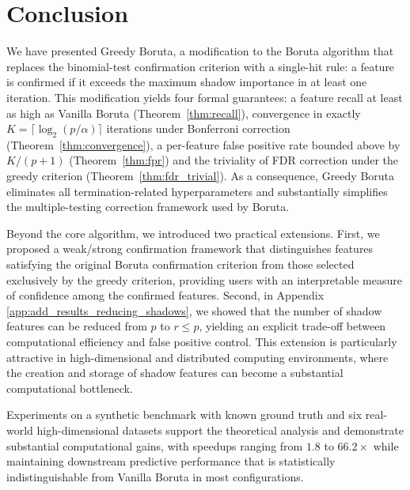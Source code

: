 \documentclass[runningheads]{llncs}
\begin{document}

\section{Conclusion}
\label{sec:conclusion}

We have presented Greedy Boruta, a modification to the Boruta algorithm that replaces the binomial-test confirmation criterion with a single-hit rule: a feature is confirmed if it exceeds the maximum shadow importance in at least one iteration. This modification yields four formal guarantees: a feature recall at least as high as Vanilla Boruta (Theorem~\ref{thm:recall}), convergence in exactly $K=\lceil \log_2(p/\alpha)\rceil$ iterations under Bonferroni correction (Theorem~\ref{thm:convergence}), a per-feature false positive rate bounded above by $K/(p+1)$ (Theorem~\ref{thm:fpr}) and the triviality of FDR correction under the greedy criterion (Theorem~\ref{thm:fdr_trivial}). As a consequence, Greedy Boruta eliminates all termination-related hyperparameters and substantially simplifies the multiple-testing correction framework used by Boruta.

Beyond the core algorithm, we introduced two practical extensions. First, we proposed a weak/strong confirmation framework that distinguishes features satisfying the original Boruta confirmation criterion from those selected exclusively by the greedy criterion, providing users with an interpretable measure of confidence among the confirmed features. Second, in Appendix \ref{app:add_results_reducing_shadows}, we showed that the number of shadow features can be reduced from $p$ to $r \leq p$, yielding an explicit trade-off between computational efficiency and false positive control. This extension is particularly attractive in high-dimensional and distributed computing environments, where the creation and storage of shadow features can become a substantial computational bottleneck.

Experiments on a synthetic benchmark with known ground truth and six real-world high-dimensional datasets support the theoretical analysis and demonstrate substantial computational gains, with speedups ranging from $1.8$ to $66.2\times$ while maintaining downstream predictive performance that is statistically indistinguishable from Vanilla Boruta in most configurations.
\end{document}

